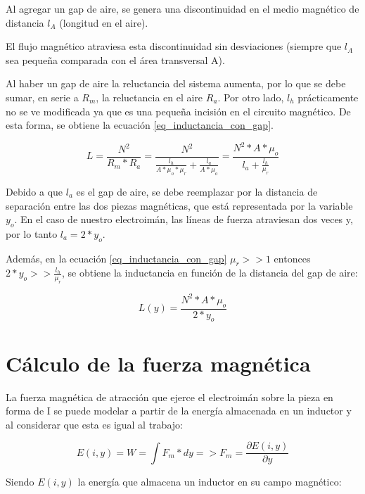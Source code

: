 \noindent Al agregar un gap de aire, se genera una discontinuidad en el medio magnético de distancia $l_{A}$ (longitud en el aire).

\noindent El flujo magnético atraviesa esta discontinuidad sin desviaciones (siempre que $l_{A}$ sea pequeña comparada con el área transversal A).

\noindent Al haber un gap de aire la reluctancia del sistema aumenta, por lo que se debe sumar, en serie a $R_{m}$, la reluctancia en el aire $R_{a}$. Por otro lado, $l_{h}$ prácticamente no se ve modificada ya que es una pequeña incisión en el circuito magnético. De esta forma, se obtiene la ecuación \ref{eq_inductancia_con_gap}.

\begin{equation}\label{eq_inductancia_con_gap}
L=\frac{N^{2}}{R_{m}*R_{a}}=\frac{N^{2}}{\frac{l_{h}}{A*\mu_{o}*\mu_{r}}+\frac{l_{a}}{A*\mu_{o}}}=\frac{N^{2}*A*\mu_{o}}{l_{a}+\frac{l_{h}}{\mu_{r}}}
\end{equation}

\noindent Debido a que $l_{a}$ es el gap de aire, se debe reemplazar por la distancia de separación entre las dos piezas magnéticas, que está representada por la variable $y_{o}$. En el caso de nuestro electroimán, las líneas de fuerza atraviesan dos veces y, por lo tanto $l_{a}=2*y_{o}$.

\noindent Además, en la ecuación \ref{eq_inductancia_con_gap} $\mu_{r}>>1$ entonces $2*y_{o}>>\frac{l_{h}}{\mu_{r}}$, se obtiene la inductancia en función de la distancia del gap de aire:

\begin{equation}\label{eq_inductancia_vs_y}
		L(y)=\frac{{N^{2}*A*\mu_{o}}}{2*y_{o}}
\end{equation}

\section{Cálculo de la fuerza magnética}

\noindent La fuerza magnética de atracción que ejerce el electroimán sobre la pieza en forma de I se puede modelar a partir de la energía almacenada en un inductor y al considerar que esta es igual al trabajo:

\begin{equation}\label{eq_energia}
	E(i,y)=W=\int{F_{m}*dy}=>F_{m}=\frac{\partial{E(i,y)}}{\partial{y}}
\end{equation}

\noindent Siendo $E(i,y)$ la energía que almacena un inductor en su campo magnético:


